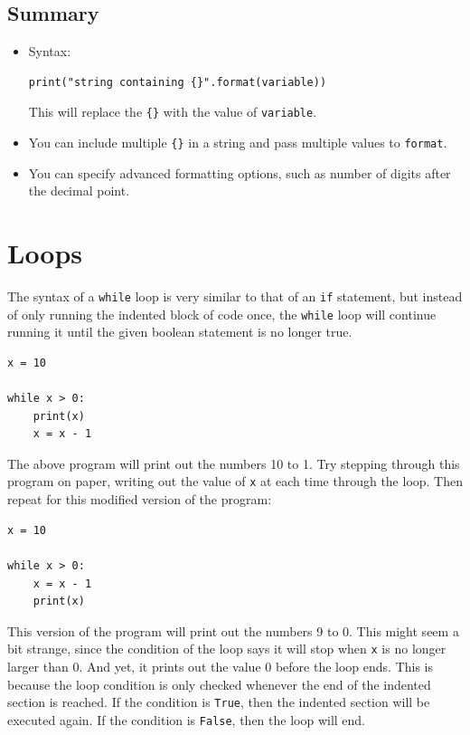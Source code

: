 \documentclass[11pt]{cselabheader}
\begin{document}
\subsection{Summary}

\begin{itemize}
  \item Syntax:
    \begin{lstlisting}
print("string containing {}".format(variable))
    \end{lstlisting}
    
    This will replace the \lstinline!{}! with the value of \lstinline{variable}.
    
  \item You can include multiple \lstinline!{}! in a string and pass multiple values to \lstinline{format}.

  \item You can specify advanced formatting options, such as number of digits after the decimal point.
\end{itemize}

\pagebreak
\section{Loops}
The syntax of a \lstinline{while} loop is very similar to that of an
\lstinline{if} statement, but instead of only running the indented block of code
once, the \lstinline{while} loop will continue running it until the given
boolean statement is no longer true.

\begin{lstlisting}[style=python]
x = 10

while x > 0:
    print(x)
    x = x - 1
\end{lstlisting}

The above program will print out the numbers 10 to 1. Try stepping through this
program on paper, writing out the value of \lstinline{x} at each time through
the loop. Then repeat for this modified version of the program:

\begin{lstlisting}[style=python]
x = 10

while x > 0:
    x = x - 1
    print(x)
\end{lstlisting}

This version of the program will print out the numbers 9 to 0. This might seem a
bit strange, since the condition of the loop says it will stop when
\lstinline{x} is no longer larger than 0. And yet, it prints out the value 0
before the loop ends. This is because the loop condition is only checked
whenever the end of the indented section is reached. If the condition is
\lstinline{True}, then the indented section will be executed again. If the
condition is \lstinline{False}, then the loop will end.
\end{document}
